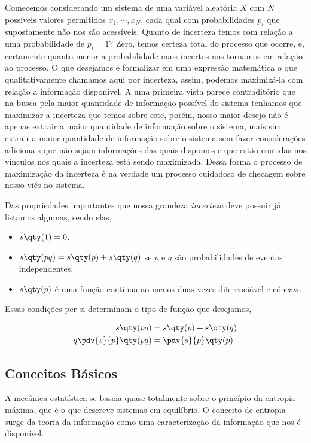 \documentclass[twoside,reqno]{amsart}
\numberwithin{equation}{section}
\begin{document}
\begin{refsection}
Comecemos considerando um sistema de uma variável aleatória $X$ com $N$ possíveis valores permitidos $x_1,\cdots,x_N$, cada qual com probabilidades $p_i$ que supostamente não nos são acessíveis. Quanto de incerteza temos com relação a uma probabilidade de $p_i=1$? Zero, temos certeza total do processo que ocorre, e, certamente quanto menor a probabilidade mais incertos nos tornamos em relação ao processo. O que desejamos é formalizar em uma expressão matemática o que qualitativamente chamamos aqui por incerteza, assim, podemos maximizá-la com relação a informação disponível. A uma primeira vista parece contraditório que na busca pela maior quantidade de informação possível do sistema tenhamos que maximizar a incerteza que temos sobre este, porém, nosso maior desejo não é apenas extrair a maior quantidade de informação sobre o sistema, mais sim extrair a maior quantidade de informação sobre o sistema sem fazer considerações adicionais que não sejam informações das quais dispomos e que estão contidas nos vínculos nos quais a incerteza está sendo maximizada. Dessa forma o processo de maximização da incerteza é na verdade um processo cuidadoso de checagem sobre nosso viés no sistema.

Das propriedades importantes que nossa grandeza \emph{incerteza} deve possuir já listamos algumas, sendo elas,

\begin{itemize}
    \item $s\qty(1)=0$.
    \item $s\qty(pq)=s\qty(p)+s\qty(q)$ se $p$ e $q$ são probabilidades de eventos independentes.
    \item $s\qty(p)$ é uma função contínua ao menos duas vezes diferenciável e côncava
\end{itemize}

Essas condições per si determinam o tipo de função que desejamos,

\begin{align}
    s\qty(pq)&=s\qty(p)+s\qty(q)\nonumber\\
    q\pdv{s}{p}\qty(pq)&=\pdv{s}{p}\qty(p)
\end{align}

\subsection{Conceitos Básicos}

A mecânica estatística se baseia quase totalmente sobre o princípio da entropia máxima, que é o que descreve sistemas em equilíbrio. O conceito de entropia surge da teoria da informação como uma caracterização da informação que nos é disponível. 


\end{refsection}
\end{document}
